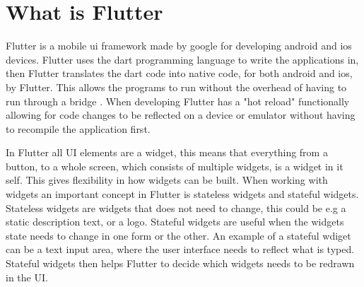\section{What is Flutter}


Flutter is a mobile ui framework made by google for developing android and ios devices. Flutter uses the dart programming language to write the applications in, then Flutter translates the dart code into native code, for both android and ios, by Flutter. This allows the programs to run without the overhead of having to run through a bridge .
When developing Flutter has a "hot reload" functionally allowing for code changes to be reflected on a device or emulator without having to recompile the application first. 

In Flutter all UI elements are a widget, this means that everything from a  button, to a  whole screen, which consists of multiple widgets, is a widget in it self. This gives flexibility in how widgets can be built. When working with widgets an important concept in Flutter is stateless widgets and stateful widgets. Stateless widgets are widgets that does not need to change, this could be  e.g a static description text, or a logo. Stateful widgets are useful when the widgets state needs to change in one form or the other.  An example of a stateful wdiget can be a text input area, where the user interface needs to reflect what is typed. Stateful widgets then helps Flutter to decide which widgets needs to be redrawn in the UI.